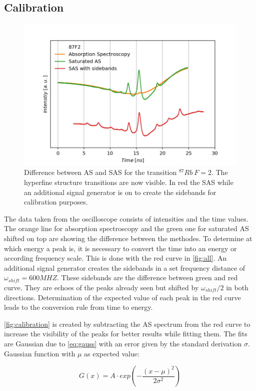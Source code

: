 \documentclass[]{article}
\begin{document}
\subsection{Calibration}
\begin{figure}[H]
\centering
\includegraphics[width=.8\textwidth]{Plots/Calibration_Second_All.png}
\caption{Difference between AS and SAS for the transition $^{87}Rb\ F=2$. The hyperfine structure transitions are now visible. In red the SAS while an additional signal generator is on to create the sidebands for calibration purposes.}
\label{fig:all}
\end{figure}

The data taken from the oscilloscope consists of intensities and the time values. The orange line for absorption spectroscopy and the green one for saturated AS shifted on top are showing the difference between the methodes.
To determine at which energy a peak is, it is necessary to convert the time into an energy or according frequency scale. This is done with the red curve in \autoref{fig:all}. An additional signal generator creates the sidebands in a set frequency distance of $\omega_{shift}=600MHZ$. These sidebands are the difference between green and red curve. They are echoes of the peaks already seen but shifted by $\omega_{shift}/2$ in both directions. Determination of the expected value of each peak in the red curve leads to the conversion rule from time to energy. 

\autoref{fig:calibration} is created by subtracting the AS spectrum from the red curve to increase the visibility of the peaks for better results while fitting them. The fits are Gaussian due to \autoref{eq:gauss} with an error given by the standard derivation $\sigma$. Gaussian function with $\mu$ as expected value:

\begin{equation}
G(x) = A \cdot exp\left( -\frac{(x-\mu)^2}{2\sigma^2} \right)
\end{equation}
\end{document}
